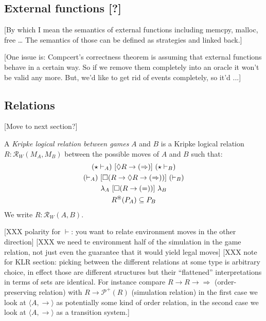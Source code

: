 \documentclass[acmsmall,anonymous]{acmart}
\newcommand{\ifr}[1]{\ [{#1}]\ }
\begin{document}

\subsection{External functions [?]} %

[By which I mean the semantics of external functions
including memcpy, malloc, free \ldots
The semantics of those can be defined as strategies
and linked back.]

[One issue is:
Compcert's correctness theorem is
assuming that external functions behave in a certain way.
So if we remove them completely into an oracle
it won't be valid any more.
But,
we'd like to get rid of events completely,
so it'd ...]


\subsection{Relations} %

[Move to next section?]

A \emph{Kripke logical relation between games} $A$ and $B$
is a Kripke logical relation $R : \mathcal{R}_W(M_A, M_B)$
between the possible moves of $A$ and $B$
such that:
\begin{gather*}
  (\star \vdash_A) \ifr{\Diamond R \rightarrow (\Rightarrow)} (\star \vdash_B) \\
  (\vdash_A) \ifr{\Box(R \rightarrow \Diamond R \rightarrow (\Rightarrow))} (\vdash_B) \\
  \lambda_A \ifr{\Box (R \rightarrow (=))} \lambda_B \\
  R^\oast(P_A) \subseteq P_B
\end{gather*}
We write $R : \mathcal{R}_W(A, B)$.


[XXX polarity for $\vdash$: you want to relate environment moves
in the other direction]
[XXX we need te environment half of the simulation
in the game relation, not just even the guarantee that it would yield
legal moves]
[XXX note for KLR section: picking between
the different relations at some type is arbitrary choice,
in effect those are different structures
but their ``flattened'' interpretations in terms of sets are identical.
For instance compare $R \rightarrow R \rightarrow \Rightarrow$
(order-preserving relation)
with $R \rightarrow \mathcal{P}^+(R)$
(simulation relation)
in the first case we look at $\langle A, \rightarrow \rangle$
as potentially some kind of order relation,
in the second case we look at $\langle A, \rightarrow \rangle$
as a transition system.]
\end{document}

